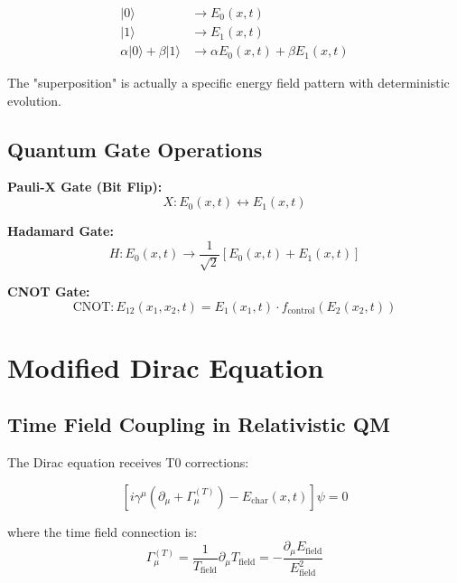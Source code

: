 \documentclass[12pt,a4paper]{report}
\begin{document}
	\begin{align}
		|0\rangle &\rightarrow E_0(x,t) \\
		|1\rangle &\rightarrow E_1(x,t) \\
		\alpha|0\rangle + \beta|1\rangle &\rightarrow \alpha E_0(x,t) + \beta E_1(x,t)
	\end{align}
	
	The "superposition" is actually a specific energy field pattern with deterministic evolution.
	
	\subsection{Quantum Gate Operations}
	\label{subsec:quantum_gate_operations}
	
	\textbf{Pauli-X Gate (Bit Flip):}
	\begin{equation}
		X: E_0(x,t) \leftrightarrow E_1(x,t)
	\end{equation}
	
	\textbf{Hadamard Gate:}
	\begin{equation}
		H: E_0(x,t) \rightarrow \frac{1}{\sqrt{2}}[E_0(x,t) + E_1(x,t)]
	\end{equation}
	
	\textbf{CNOT Gate:}
	\begin{equation}
		\text{CNOT}: E_{12}(x_1,x_2,t) = E_1(x_1,t) \cdot f_{\text{control}}(E_2(x_2,t))
	\end{equation}
	
	\section{Modified Dirac Equation}
	\label{sec:modified_dirac}
	
	\subsection{Time Field Coupling in Relativistic QM}
	\label{subsec:dirac_time_field}
	
	The Dirac equation receives T0 corrections:
	
	\begin{equation}
		\left[i\gamma^\mu\left(\partial_\mu + \Gamma_\mu^{(T)}\right) - E_{\text{char}}(x,t)\right]\psi = 0
	\end{equation}
	
	where the time field connection is:
	\begin{equation}
		\Gamma_\mu^{(T)} = \frac{1}{T_{\text{field}}} \partial_\mu T_{\text{field}} = -\frac{\partial_\mu E_{\text{field}}}{E_{\text{field}}^2}
	\end{equation}
	
\end{document}
